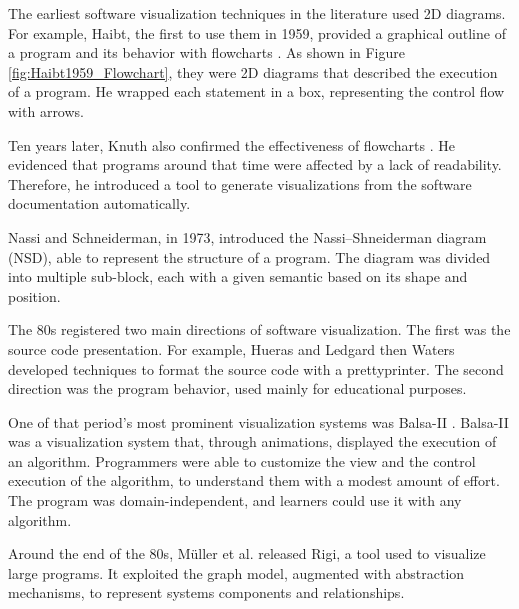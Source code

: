 

\bigbreak

The earliest software visualization techniques in the literature used 2D diagrams. 
For example, Haibt, the first to use them in 1959, provided a graphical outline of a program and its behavior with flowcharts \cite{Haibt1959}. 
As shown in Figure \ref{fig:Haibt1959_Flowchart}, they were 2D diagrams that described the execution of a program.
He wrapped each statement in a box, representing the control flow with arrows.

 \bigbreak
Ten years later, Knuth also confirmed the effectiveness of flowcharts \cite{Knuth1963}. 
He evidenced that programs around that time were affected by a lack of readability.
Therefore, he introduced a tool to generate visualizations from the software documentation automatically.

\bigbreak
Nassi and Schneiderman\cite{Nassi1973}, in 1973, introduced the Nassi–Shneiderman diagram (NSD), able to represent the structure of a program. 
The diagram was divided into multiple sub-block, each with a given semantic based on its shape and position. 

\bigbreak
The 80s registered two main directions of software visualization. The first was the source code presentation.
For example, Hueras and Ledgard \cite{Hueras1977} then Waters \cite{Waters1983} developed techniques to format the source code with a prettyprinter. 
The second direction was the program behavior, used mainly for educational purposes.
 
\bigbreak
One of that period's most prominent visualization systems was Balsa-II \cite{Brown1988}.
Balsa-II was a visualization system that, through animations, displayed the execution of an algorithm.
Programmers were able to customize the view and the control execution of the algorithm, to understand them with a modest amount of effort. 
The program was domain-independent, and learners could use it with any algorithm. 

\bigbreak
Around the end of the 80s, Müller et al. \cite{Mueller1988} released Rigi, a tool used to visualize large programs.
It exploited the graph model, augmented with abstraction mechanisms, to represent systems components and relationships. 

